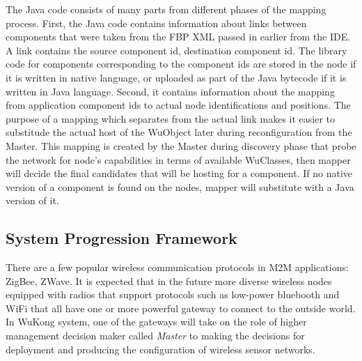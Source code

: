 The Java code consists of many parts from different phases of the mapping process.
First, the Java code contains information about links between components that
were taken from the FBP XML passed in earlier from the IDE. A link contains the
source component id, destination component id. The library code for components
corresponding to the component ids are stored in the node if it is written in
native language, or uploaded as part of the Java bytecode if it is written in
Java language. Second, it contains information about the mapping from
application component ids to actual node identifications and positions. The
purpose of a mapping which separates from the actual link makes it easier to
substitude the actual host of the WuObject later during
reconfiguration from the Master. This mapping is created by the Master during
discovery phase that probe the network for node's capabilities in terms of
available WuClasses, then mapper will decide the final candidates that will be
hosting for a component. If no native version of a component is found on the
nodes, mapper will substitute with a Java version of it.

\subsection{System Progression Framework}

There are a few popular wireless communication protocols in M2M applications:
ZigBee, ZWave. It is expected that in the future more diverse
wireless nodes equipped with radios that support protocols such as low-power
bluebooth and WiFi that all have one or more powerful gateway to connect to the
outside world. In WuKong system, one of the gateways will take on the role of
higher management decision maker called \emph{Master} to making the decisions for
deployment and producing the configuration of wireless sensor networks.


